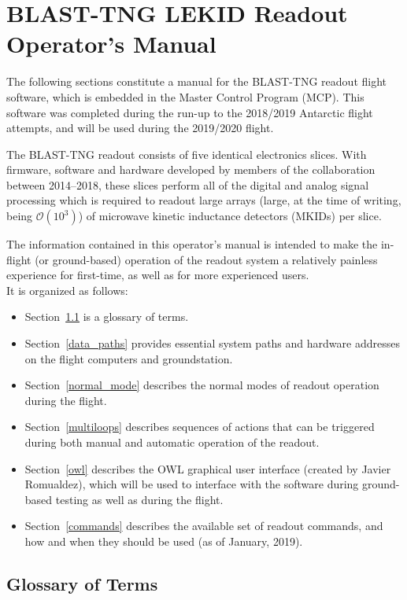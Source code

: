 \chapter{BLAST-TNG LEKID Readout Operator's Manual}\label{mcp}

The following sections constitute a manual for the BLAST-TNG readout flight software, which is embedded in the Master Control Program (MCP). This software was completed during the run-up to the 2018/2019 Antarctic flight attempts, and will be used during the 2019/2020 flight.

The BLAST-TNG readout consists of five identical electronics slices. With firmware, software and hardware developed by members of the collaboration between 2014--2018, these slices perform all of the digital and analog signal processing which is required to readout large arrays (large, at the time of writing, being $\mathcal{O}(10^{3})$) of microwave kinetic inductance detectors (MKIDs) per slice.

The information contained in this operator’s manual is intended to make the in-flight (or ground-based) operation of the readout system a relatively painless experience for first-time, as well as for more experienced users.\\

It is organized as follows:
\begin{itemize}[nosep]
  \item Section~\ref{gloss} is a glossary of terms.
  \item Section~\ref{data_paths} provides essential system paths and hardware addresses on the flight computers and groundstation.
  \item Section~\ref{normal_mode} describes the normal modes of readout operation during the flight.
  \item Section~\ref{multiloops} describes sequences of actions that can be triggered during both manual and automatic operation of the readout.
  \item Section~\ref{owl} describes the OWL graphical user interface (created by Javier Romualdez), which will be used to interface with the software during ground-based testing as well as during the flight.
  \item Section~\ref{commands} describes the available set of readout commands, and how and when they should be used (as of January, 2019).
\end{itemize}

\section{Glossary of Terms}\label{gloss}

